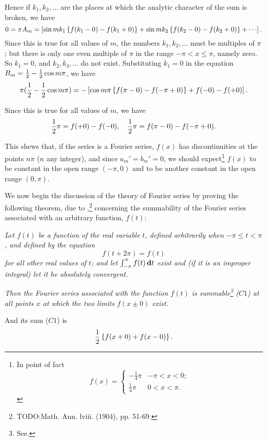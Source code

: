 Hence if $k_{1}, k_{2},\ldots$ are the places at which the analytic
character of the sum is broken, we have
$$
0
=
\pi A_{m}
=
\thebracket{
  \sin m k_{1} \thebrace{
    f(k_{1} - 0) - f(k_{1} + 0)
  }
  +
  \sin m k_{2} \thebrace{
    f(k_{2} - 0) - f(k_{2} + 0)
  }
  +
  \cdots
}.
$$
Since this is true for all values of $m$, the numbers
$k_{1}, k_{2}, \ldots$ must
be multiples of $\pi$; but
there is only one even multiple of $\pi$ in the range
$-\pi < x \leq \pi$, namely zero.
So $k_{1} = 0$,
and $k_{2}, k_{3}, \ldots$ do not exist.
Substituting $k_{1} = 0$ in the equation
$B_{m} = \frac{1}{2} - \frac{1}{2} \cos m \pi$, we have
$$
\pi (\frac{1}{2} - \frac{1}{2} \cos m \pi)
=
- \left[ 
  \cos m \pi \left\{ 
    f(\pi - 0) - f(-\pi + 0)
   \right\}
  + f(-0)
  - f(+0)
 \right].
$$

Since this is true for all values of $m$, we have
$$
\frac{1}{2} \pi = f(+0) - f(-0),
\quad
\frac{1}{2} \pi = f(\pi - 0) - f(-\pi + 0).
$$

This shews that, if the
series is a Fourier series, $f(x)$ has discontinuities at the points
$n \pi$ ($n$ any integer), and since $a_{m}' = b_{m}' = 0$, we should
expect\footnote{In point of fact
  $$
  f(x)
  =
  \begin{cases}
    -\frac{1}{4} \pi & -\pi < x < 0;\\
    \frac{1}{4} \pi & 0 < x < \pi.
  \end{cases}
  $$
} $f(x)$
to be constant in the open range $(-\pi, 0)$ and to be another constant
in the open range $(0, \pi)$.


We now begin the discussion of the theory of Fourier series by proving
the following theorem, due to \Fejer,\footnote{TODO:Math. Ann. lviii. (1904), pp. 51-69.}
concerning the summability of
the Fourier series associated with an arbitrary function, $f(t)$:

\emph{Let $f(t)$ be a function of the real variable $t$, defined arbitrarily
  when $-\pi \leq t < \pi$, and defined by the equation
  $$
  f(t + 2\pi) = f(t)
  $$
%
%
  for all other real values of $t$; and let
  $\int_{-\pi}^{\pi} f(t) \, \mathbf{d} t$
  exist and (if it is an improper integral)
  let it he absolutely convergent.
}

\emph{Then the Fourier series associated with the function
  $f(t)$ is summable\footnote{See.} ($C1$)
  at all points $x$ at which the two limits $f(x \pm 0)$ exist.}

And its sum ($C1$) is
$$
\frac{1}{2} \left\{ 
  f(x + 0) + f(x-0)
 \right\}.
$$


